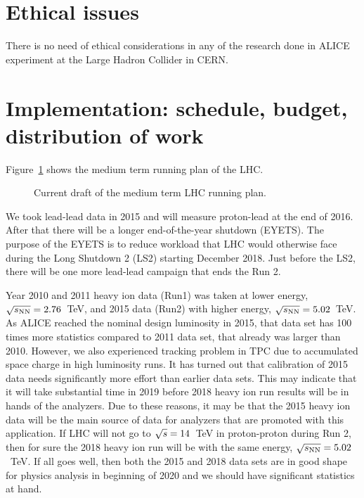 
\section{Ethical issues}

There is no need of ethical considerations in any of the research done in ALICE experiment at the Large Hadron Collider in CERN.


\section{Implementation: schedule, budget, distribution of work} %
\label{sec:implementation}

Figure~\ref{fig:LHC-mid-term} shows the medium term running plan of the LHC. 
\begin{figure}[htbp]
   \centering
   \caption{Current draft of the medium term LHC running plan.}
   \label{fig:LHC-mid-term}
\end{figure}
We took lead-lead data in 2015 and will measure proton-lead at the end of 2016. After that there will be a longer end-of-the-year shutdown (EYETS). The purpose of the EYETS is to reduce workload that LHC would otherwise face during the Long Shutdown 2 (LS2) starting December 2018. Just before the LS2, there will be one more lead-lead campaign that ends the Run 2.

Year 2010 and 2011 heavy ion data (Run1) was taken at lower energy, $\sqrt{s_{\rm NN}}=2.76$~TeV, and 2015 data (Run2) with higher energy, $\sqrt{s_{\rm NN}}=5.02$~TeV. As ALICE reached the nominal design luminosity in 2015, that data set has 100 times more statistics compared to 2011 data set, that already was larger than 2010. However, we also experienced tracking problem in TPC due to accumulated space charge in high luminosity runs. It has turned out that calibration of 2015 data needs significantly more effort than earlier data sets. This may indicate that it will take substantial time in 2019 before 2018 heavy ion run results will be in hands of the analyzers. Due to these reasons, it may be that the 2015 heavy ion data will be the main source of data for analyzers that are promoted with this application. If LHC will not go to $\sqrt{s}{}=14$~TeV in proton-proton during Run 2, then for sure the 2018 heavy ion run will be with the same energy, $\sqrt{s_{\rm NN}}=5.02$~TeV. If all goes well, then both the 2015 and 2018 data sets are in good shape for physics analysis in beginning of 2020 and we should have significant statistics at hand.

